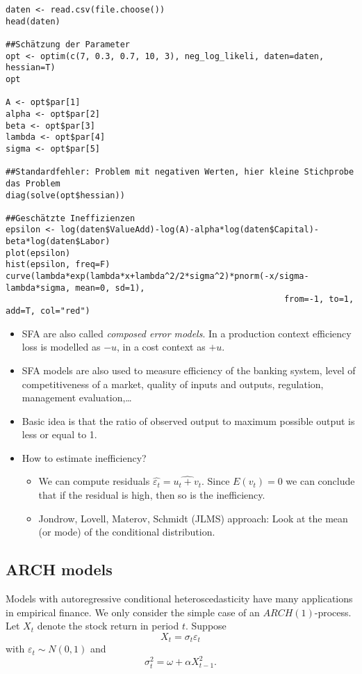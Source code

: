 \documentclass{article}
\begin{document}
\begin{solution}
\begin{enumerate}
\begin{verbatim}
daten <- read.csv(file.choose())
head(daten)

##Schätzung der Parameter
opt <- optim(c(7, 0.3, 0.7, 10, 3), neg_log_likeli, daten=daten, hessian=T)
opt

A <- opt$par[1]
alpha <- opt$par[2]
beta <- opt$par[3]
lambda <- opt$par[4]
sigma <- opt$par[5]

##Standardfehler: Problem mit negativen Werten, hier kleine Stichprobe das Problem
diag(solve(opt$hessian))

##Geschätzte Ineffizienzen
epsilon <- log(daten$ValueAdd)-log(A)-alpha*log(daten$Capital)-beta*log(daten$Labor)
plot(epsilon)
hist(epsilon, freq=F)
curve(lambda*exp(lambda*x+lambda^2/2*sigma^2)*pnorm(-x/sigma-lambda*sigma, mean=0, sd=1),
                                                        from=-1, to=1, add=T, col="red")
\end{verbatim}
\end{enumerate}

\begin{itemize}
  \item SFA are also called \emph{composed error models}. In a production context efficiency loss is modelled as $-u$, in a cost context as $+u$.
  \item SFA models are also used to measure efficiency of the banking system, level of competitiveness of a market, quality of inputs and outputs, regulation, management evaluation,\dots
  \item Basic idea is that the ratio of observed output to maximum possible output is less or equal to 1.
  \item How to estimate inefficiency?
  \begin{itemize}
    \item We can compute residuals $\hat{\varepsilon_t} = \widehat{u_t+v_t}$. Since $E(v_t)=0$ we can conclude that if the residual is high, then so is the inefficiency.
    \item Jondrow, Lovell, Materov, Schmidt (JLMS) approach: Look at the mean (or mode) of the conditional distribution.
  \end{itemize}
\end{itemize}
\end{solution}


\subsection{ARCH models\label{arch}}

Models with autoregressive conditional heteroscedasticity have many
applications in empirical finance. We only consider the simple case of an $%
ARCH(1)$-process. Let $X_{t}$ denote the stock return in period $t$. Suppose%
\begin{equation*}
X_{t}=\sigma _{t}\varepsilon _{t}
\end{equation*}%
with $\varepsilon _{t}\sim N(0,1)$ and%
\begin{equation*}
\sigma _{t}^{2}=\omega +\alpha X_{t-1}^{2}.
\end{equation*}
\end{document}
